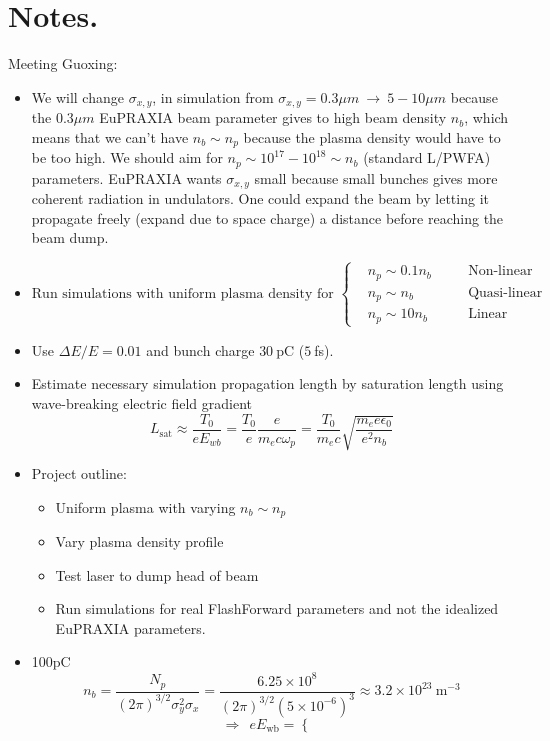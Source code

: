 \section{Notes.}
Meeting Guoxing:
\begin{itemize}
\item We will change $\sigma_{x,y}$, in simulation from $\sigma_{x,y}=0.3 \mu m ~\to~5-10 \mu m$ because the $0.3\mu m$ EuPRAXIA beam parameter gives to high beam density $n_b$, which means that we can't have $n_b\sim n_p$ because the plasma density would have to be too high. We should aim for $n_p\sim 10^{17}-10^{18}\sim n_b$ (standard L/PWFA) parameters. 
EuPRAXIA wants $\sigma_{x,y}$ small because small bunches gives more coherent radiation in undulators. One could expand the beam by letting it propagate freely (expand due to space charge) a distance before reaching the beam dump. 
\item $\text{Run simulations with uniform plasma density for }\left\{\begin{aligned}
&n_p\sim 0.1 n_b \quad &&\text{Non-linear}\\
&n_p\sim  n_b\quad &&\text{Quasi-linear}\\
&n_p\sim 10 n_b\quad &&\text{Linear}
\end{aligned}\right.$ \\
\item Use $\Delta E/E=0.01$ and bunch charge $30~$pC ($5~$fs).\\
\item Estimate necessary simulation propagation length by saturation length using wave-breaking electric field gradient 
$$L_{\text{sat}}\approx \frac{T_0}{eE_{wb}}=\frac{T_0}{e}\frac{e}{m_e c\omega_p}=\frac{T_0}{m_e c}\sqrt{\frac{m_e e\epsilon_0}{e^2n_b}} $$ 
\item Project outline:
\begin{itemize}
\item Uniform plasma with varying $n_b\sim n_p$
\item Vary plasma density profile
\item Test laser to dump head of beam
\item Run simulations for real FlashForward parameters and not the idealized EuPRAXIA parameters.
\end{itemize}
\item  100pC $$n_b=\frac{N_p}{(2\pi)^{3/2} \sigma_y^2\sigma_x}=\frac{6.25\times 10^{8}}{(2\pi)^{3/2} (5\times 10^{-6})^3}\approx 3.2\times 10^{23}~ \text{m}^{-3} $$
$$\Rightarrow ~~eE_{\text{wb}}=\left\{\begin{aligned}

\end{aligned}$$
\end{itemize}
